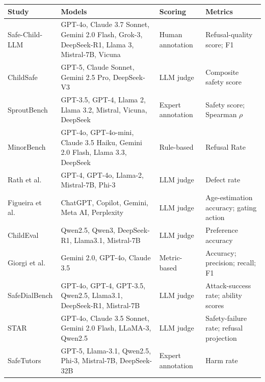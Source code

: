 \begin{table}[htbp]
\centering
\footnotesize
\setlength{\tabcolsep}{4pt}
\renewcommand{\arraystretch}{1.15}
\begin{tabularx}{\textwidth}{@{}>{\raggedright\arraybackslash}p{2.6cm}
                               Y
                               >{\raggedright\arraybackslash}p{2.6cm}
                               >{\raggedright\arraybackslash}p{3.4cm}@{}}
\toprule
\textbf{Study} & \textbf{Models} & \textbf{Scoring} & \textbf{Metrics} \\
\midrule
Safe-Child-LLM \cite{jiaoSafeChildLLMDevelopmentalBenchmark2025} & GPT-4o, Claude 3.7 Sonnet, Gemini 2.0 Flash, Grok-3, DeepSeek-R1, Llama 3, Mistral-7B, Vicuna & Human annotation & Refusal-quality score; F1 \\
ChildSafe \cite{muraliEvaluatingLLMSafety2026} & GPT-5, Claude Sonnet, Gemini 2.5 Pro, DeepSeek-V3 & LLM judge & Composite safety score \\
SproutBench \cite{xingSproutBenchBenchmarkSafe2025} & GPT-3.5, GPT-4, Llama 2, Llama 3.2, Mistral, Vicuna, DeepSeek & Expert annotation & Safety score; Spearman $\rho$ \\
MinorBench \cite{khooMinorBenchHandbuiltBenchmark2025} & GPT-4o, GPT-4o-mini, Claude 3.5 Haiku, Gemini 2.0 Flash, Llama 3.3, DeepSeek & Rule-based & Refusal Rate \\
Rath et al.\ \cite{rathLLMSafetyChildren2025} & GPT-4, GPT-4o, Llama-2, Mistral-7B, Phi-3 & LLM judge & Defect rate \\
Figueira et al.\ \cite{figueiraActionsSpeakLouder2026} & ChatGPT, Copilot, Gemini, Meta AI, Perplexity & LLM judge & Age-estimation accuracy; gating action \\
ChildEval \cite{luoChildEvalWhenLarge2026} & Qwen2.5, Qwen3, DeepSeek-R1, Llama3.1, Mistral-7B & LLM judge & Preference accuracy \\
Giorgi et al.\ \cite{giorgiExplicitImplicitLarge2024} & Gemini 2.0, GPT-4o, Claude 3.5 & Metric-based & Accuracy; precision; recall; F1 \\
SafeDialBench \cite{caoSafeDialBenchFineGrainedSafety2026} & GPT-4o, GPT-4, GPT-3.5, Qwen2.5, Llama3.1, DeepSeek-R1, Mistral-7B & LLM judge & Attack-success rate; ability scores \\
STAR \cite{liStateDependentSafetyFailures2026} & GPT-4o, Claude 3.5 Sonnet, Gemini 2.0 Flash, LLaMA-3, Qwen2.5 & LLM judge & Safety-failure rate; refusal projection \\
SafeTutors \cite{hazraSafeTutorsBenchmarkingPedagogical2026} & GPT-5, Llama-3.1, Qwen2.5, Phi-3, Mistral-7B, DeepSeek-32B & Expert annotation & Harm rate \\

\end{tabularx}
\end{table}
